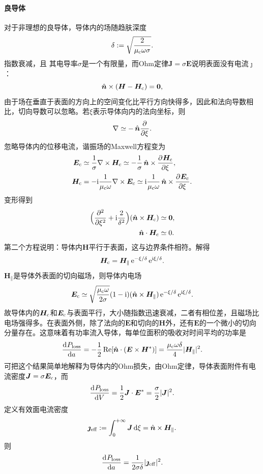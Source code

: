 \paragraph{良导体}

对于非理想的良导体，导体内的场随趋肤深度
\begin{equation}
    \delta:=\sqrt{\frac2{\mu\c\omega\sigma}}.
\end{equation}
指数衰减，且
其电导率$\sigma$是一个有限量，而Ohm定律$\bm J=\sigma\bm E$说明表面没有电流$\bm\jmath$：
\[
    \uvec n\times(\bm H-\bm H\c)=\bm 0,
\]
由于场在垂直于表面的方向上的空间变化比平行方向快得多，因此和法向导数相比，切向导数可以忽略。若$\xi$表示导体向内的法向坐标，则
\[
    \nabla\simeq-\uvec n\pp\xi.
\]
忽略导体内的位移电流，谐振场的Maxwell方程变为
\begin{align*}
    \bm E\c&\simeq\frac1\sigma\curl\bm H\c\simeq-\frac1\sigma\uvec n\times\pv{\bm H\c}\xi,\\
    \bm H\c&=-\i\frac1{\mu\c\omega}\curl\bm E\c\simeq\i\frac1{\mu\c\omega}\uvec n\times\pv{\bm E\c}\xi.
\end{align*}
变形得到
\begin{align*}
    \Bigkh{\pp[2]\xi+\i\frac2{\delta^2}}(\uvec n\times\bm H\c)&\simeq\bm 0,\\
    \uvec n\cdot\bm H\c&\simeq 0.
\end{align*}
第二个方程说明：导体内$\bm H$平行于表面，这与边界条件相符。解得
\begin{equation}
    \bm H\c=\bm H_\parallel\e{-\xi/\delta}\e{\i\xi/\delta}.
\end{equation}
$\bm H_\parallel$是导体外表面的切向磁场，则导体内电场
\begin{equation}
    \bm E\c\simeq\sqrt{\frac{\mu\c\omega}{2\sigma}}(1-\i)(\uvec n\times\bm H_\parallel)\e{-\xi/\delta}\e{\i\xi/\delta}.
\end{equation}
故导体内的$\bm H\c$和$\bm E\c$与表面平行，大小随指数迅速衰减，二者有相位差，且磁场比电场强得多。在表面外侧，除了法向的$\bm E$和切向的$\bm H$外，还有$\bm E$的一个微小的切向分量存在。这意味着有功率流入导体，每单位面积的吸收对时间平均的功率是
\begin{equation}
    \dv{P_\text{loss}}a=-\frac12\Re[\uvec n\cdot(\bm E\times\bm H\cj)]=\frac{\mu\c\omega\delta}4|\bm H_\parallel|^2.
\end{equation}
可把这个结果简单地解释为导体内的Ohm损失，由Ohm定律，导体表面附件有电流密度$\bm J=\sigma\bm E\c$，而
\[
    \dv{P_\text{loss}}V=\frac12\bm J\cdot\bm E\cj=\frac\sigma 2|\bm J|^2.
\]
定义有效面电流密度
\[
    \bm\jmath\eff:=\int\zti\bm J\d\xi=\uvec n\times\bm H_\parallel.
\]
则
\[
    \dv{P_\text{loss}}a=\frac1{2\sigma\delta}|\bm\jmath\eff|^2.
\]
